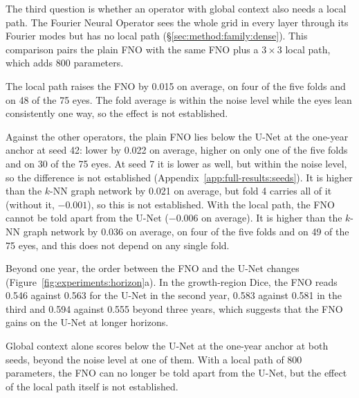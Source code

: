 The third question is whether an operator with global context also needs
a local path. The Fourier Neural Operator sees the whole grid in every
layer through its Fourier modes but has no local path
(\S\ref{sec:method:family:dense}). This comparison pairs the plain FNO
with the same FNO plus a $3 \times 3$ local path, which adds 800
parameters.

The local path raises the FNO by 0.015 on average, on four of the five
folds and on 48 of the 75 eyes. The fold average is within the noise level
while the eyes lean consistently one way, so the effect is not
established.

Against the other operators, the plain FNO lies below the U-Net at the
one-year anchor at seed 42: lower by 0.022 on average, higher on only one
of the five folds and on 30 of the 75 eyes. At seed 7 it is lower as well,
but within the noise level, so the difference is not established
(Appendix~\ref{app:full-results:seeds}). It is higher than the $k$-NN graph network
by 0.021 on average, but fold 4 carries all of it (without it, $-0.001$),
so this is not established. With the local path, the FNO cannot be told
apart from the U-Net ($-0.006$ on average). It is higher than the $k$-NN
graph network by 0.036 on average, on four of the five folds and on 49 of
the 75 eyes, and this does not depend on any single fold.

Beyond one year, the order between the FNO and the U-Net changes
(Figure~\ref{fig:experiments:horizon}a). In the growth-region Dice, the
FNO reads 0.546 against 0.563 for the U-Net in the second year, 0.583
against 0.581 in the third and 0.594 against 0.555 beyond three years,
which suggests that the FNO gains on the U-Net at longer horizons.

Global context alone scores below the U-Net at the one-year anchor at both
seeds, beyond the noise level at one of them. With a local path of 800 parameters, the FNO can no longer be told
apart from the U-Net, but the effect of the local path itself is not
established.

